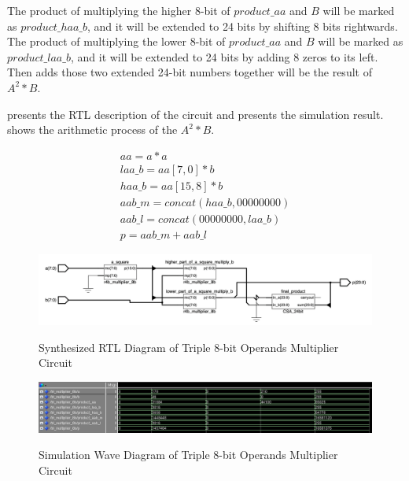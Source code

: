 The product of multiplying the higher 8-bit of \(product\_aa\) and \(B\) will be marked as \(product\_haa\_b\), and it will be extended to 24 bits by shifting 8 bits rightwards.
The product of multiplying the lower 8-bit of \(product\_aa\) and \(B\) will be marked as \(product\_laa\_b\), and it will be extended to 24 bits by adding 8 zeros to its left.
Then adds those two extended 24-bit numbers together will be the result of \textbf{\(A^2 \ast B\)}.

 presents the RTL description of the circuit and  presents the simulation result.
 shows the arithmetic process of the \textbf{\(A^2 \ast B\)}.

\begin{equation}
	\begin{array}{c}
		aa = a \ast a                     \\
		laa\_b = aa[7, 0] \ast b          \\
		haa\_b = aa[15, 8] \ast b         \\
		aab\_m = concat(haa\_b, 00000000) \\
		aab\_l = concat(00000000, laa\_b) \\
		p = aab\_m + aab\_l
	\end{array}
	\label{exp:tri}
\end{equation}

\begin{figure}[!ht]
	\centering
	\caption{Synthesized RTL Diagram of Triple 8-bit Operands Multiplier Circuit}
	\includegraphics[width=\textwidth]{../img/tri_rtl.png}
	\label{fig:tri_rtl}
\end{figure}

\begin{figure}[!ht]
	\centering
	\caption{Simulation Wave Diagram of Triple 8-bit Operands Multiplier Circuit}
	\includegraphics[width=\textwidth]{../img/tri_sim.png}
	\label{fig:tri_sim}
\end{figure}

